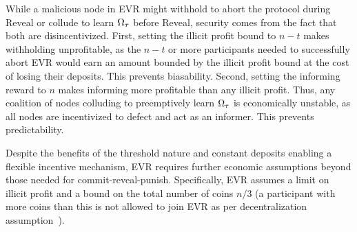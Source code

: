 While a malicious node in EVR might withhold to abort the protocol during Reveal or collude to learn $\Omega_\tau$ before Reveal, security comes from the fact that both are disincentivized. First, setting the illicit profit bound to $n - t$ makes withholding unprofitable, as the $n - t$ or more participants needed to successfully abort EVR would earn an amount bounded by the illicit profit bound at the cost of losing their deposits. This prevents biasability. Second, setting the informing reward to $n$ makes informing more profitable than any illicit profit. Thus, any coalition of nodes colluding to preemptively learn $\Omega_\tau$ is economically unstable, as all nodes are incentivized to defect and act as an informer. This prevents predictability.

Despite the benefits of the threshold nature and constant deposits enabling a flexible incentive mechanism, EVR requires further economic assumptions beyond those needed for commit-reveal-punish. Specifically, EVR assumes a limit on illicit profit and a bound on the total number of coins $n / 3$ (a participant with more coins than this is not allowed to join EVR as per decentralization assumption~\cite{david2020economically}).
